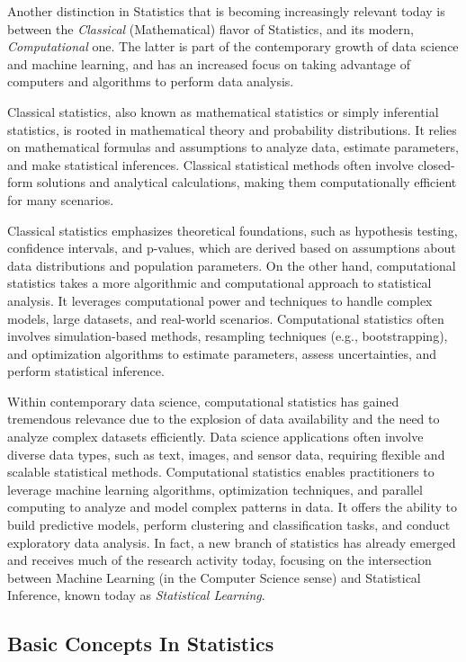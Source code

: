 \documentclass{article}
\begin{document}
Another distinction in Statistics that is becoming increasingly relevant today is between the \emph{Classical} (Mathematical) flavor of Statistics, and its modern, \emph{Computational} one. The latter is part of the contemporary growth of data science and machine learning, and has an increased focus on taking advantage of computers and algorithms to perform data analysis.

Classical statistics, also known as mathematical statistics or simply inferential statistics, is rooted in mathematical theory and probability distributions. It relies on mathematical formulas and assumptions to analyze data, estimate parameters, and make statistical inferences. Classical statistical methods often involve closed-form solutions and analytical calculations, making them computationally efficient for many scenarios.

Classical statistics emphasizes theoretical foundations, such as hypothesis testing, confidence intervals, and p-values, which are derived based on assumptions about data distributions and population parameters. On the other hand, computational statistics takes a more algorithmic and computational approach to statistical analysis. It leverages computational power and techniques to handle complex models, large datasets, and real-world scenarios. Computational statistics often involves simulation-based methods, resampling techniques (e.g., bootstrapping), and optimization algorithms to estimate parameters, assess uncertainties, and perform statistical inference.

Within contemporary data science, computational statistics has gained tremendous relevance due to the explosion of data availability and the need to analyze complex datasets efficiently. Data science applications often involve diverse data types, such as text, images, and sensor data, requiring flexible and scalable statistical methods. Computational statistics enables practitioners to leverage machine learning algorithms, optimization techniques, and parallel computing to analyze and model complex patterns in data. It offers the ability to build predictive models, perform clustering and classification tasks, and conduct exploratory data analysis. In fact, a new branch of statistics has already emerged and receives much of the research activity today, focusing on the intersection between Machine Learning (in the Computer Science sense) and Statistical Inference, known today as \emph{Statistical Learning}.

\subsection{Basic Concepts In Statistics}
\end{document}
